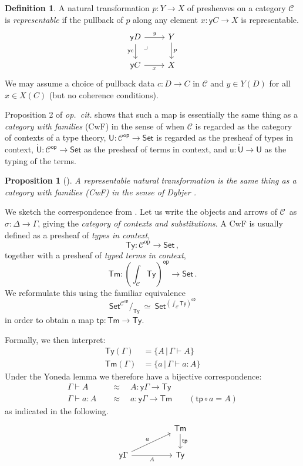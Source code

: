 \documentclass[12pt,reqno]{amsart}
\newcommand{\CC}{\ensuremath{\mathcal{C}}}
\newcommand{\op}[1]{\ensuremath{{#1}^{\mathsf{op}}}}
\newcommand{\pshx}[1]{\ensuremath{\mathsf{Set}^{\op{#1}}}}
\newcommand{\Set}{\ensuremath{\mathsf{Set}}}
\newcommand{\y}{\ensuremath{\mathsf{y}}} %
\newcommand{\tp}{\ensuremath{\mathsf{tp}}}
\newcommand{\Tm}{\ensuremath{\mathsf{Tm}}}
\newcommand{\Ty}{\ensuremath{\mathsf{Ty}}}
\renewcommand{\to}{\ensuremath{\rightarrow}}
\newcommand{\terms}[2]{#1 \vdash #2}
\newcommand{\Gterms}[1]{\terms{\Gamma}{#1}}
\renewcommand{\t}{\ensuremath{\mathsf{u}}}
\newcommand{\T}{\ensuremath{\mathsf{U}}}
\newcommand{\TT}{\ensuremath{\dot{\mathsf{U}}}}
\newcommand{\pbcorner}{\arrow[dr,phantom,"\lrcorner" very near start, shift right=.5ex]} %
\newtheorem{proposition}[theorem]{Proposition}
\theoremstyle{remark}
\theoremstyle{definition}
\newtheorem{definition}[theorem]{Definition}
\begin{document}
\begin{definition}\label{def:representablenattrans} A natural transformation $p : Y \to X$ of presheaves on a category $\CC$  is \emph{representable} if the pullback of $p$ along any element $x: \y{C} \to X$ is representable.
\begin{equation*}
\begin{tikzcd}
 \y{D} \ar[d,swap,"{\y{c}}"] \ar[r,"y"] \pbcorner &  Y \ar[d, "p"]\\
\y{C} \ar[r,swap,"x"]  & X
\end{tikzcd}
\end{equation*}
We may assume a choice of pullback data $c : D \to C$ in $\CC$ and $y \in Y(D)$ for all $x\in X(C)$ (but no coherence conditions).
\end{definition}

Proposition 2 of \emph{op.\ cit.} shows that such a map is essentially the same thing as a \emph{category with families} (CwF) in the sense of \cite{Dybjer:CWF} when $\CC$ is regarded as the category of contexts of a type theory, $\T: \op{\CC} \to \Set$ is regarded as the presheaf of types in context, $\TT: \op{\CC} \to \Set$ as the presheaf of terms in context, and $\t : \TT\to\T$ as the typing of the terms.   

\begin{proposition}[\cite{awodey:NM, Fiore:2012}] A representable natural transformation is the same thing as a \emph{category with families (CwF)} in the sense of Dybjer \cite{Dybjer:CWF}.
\end{proposition}

We sketch the correspondence from \cite{awodey:NM}.
Let us write the objects and arrows of \CC\ as $\sigma : \Delta \to \Gamma$, giving the \emph{category of contexts and substitutions}.
A CwF is usually defined as a presheaf of \emph{types in context}, 
\[
\Ty : \CC^{\mathrm{op}}\to \Set\,,
\]
together with a presheaf of \emph{typed terms in context}, 
\[
\Tm : {\textstyle (\int_{\CC}\!\Ty)^{\mathsf{op}}\to \Set }\,.
\]
We reformulate this using the familiar equivalence
\[\textstyle
 \pshx{\CC}\!/_{\Ty}\ \simeq\ \pshx{(\int_{\CC}\Ty)}
\]
in order to obtain a map $\tp :\Tm \to \Ty$.


Formally, we then interpret:
\begin{align*}
 \Ty(\Gamma) &= \{ A \,|\, \Gamma \vdash A\} \\
 \Tm(\Gamma) &= \{ a \,|\, \Gamma \vdash a:A\} 
\end{align*}
Under the Yoneda lemma we therefore have a bijective correspondence:
\begin{align*}
\Gamma\vdash A\quad &\approx\quad A : \y{\Gamma}\to \Ty  \\
\Gterms{a:A}\quad &\approx\quad  a: \y{\Gamma}\to \Tm  \qquad (\tp\circ a = A)
\end{align*}
as indicated in the following.
\[
\begin{tikzcd}
 	&&  {\Tm} \ar[d,"{\tp}"]\\
\y\Gamma \ar[rru, "a"]   \ar[rr ,swap,  "A"]   && {\Ty}
\end{tikzcd}
\]
%
\end{document}
